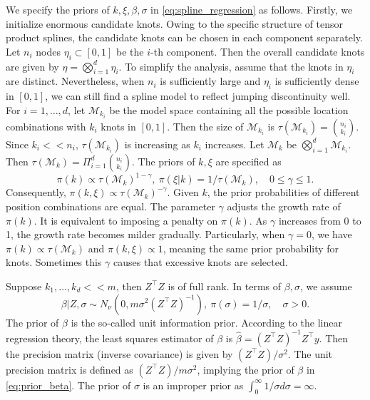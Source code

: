 We specify the priors of $k,\xi,\beta,\sigma$ in \eqref{eq:spline_regression} as follows. Firstly, we initialize enormous candidate knots. Owing to the specific structure of tensor product splines, the candidate knots can be chosen in each component separately. Let $n_i$ nodes $\eta_i\subset [0,1]$ be the $i$-th component. Then the overall candidate knots are given by $\eta=\bigotimes_{i=1}^d \eta_i$. To simplify the analysis, assume that the knots in $\eta_i$ are distinct. Nevertheless, when $n_i$ is sufficiently large and $\eta_i$ is sufficiently dense in $[0,1]$, we can still find a spline model to reflect jumping discontinuity well. %
For $i=1,\ldots,d$, let $\mathcal{M}_{k_i}$ be the model space containing all the possible location combinations with $k_i$ knots in $[0,1]$. Then the size of $\mathcal{M}_{k_i}$ is $\tau(\mathcal{M}_{k_i})=\binom{n_i}{k_i}$. Since $k_i<<n_i$, $\tau(\mathcal{M}_{k_i})$ is increasing as $k_i$ increases. Let $\mathcal{M}_k$ be $\bigotimes_{i=1}^d \mathcal{M}_{k_i}$. Then $\tau(\mathcal{M}_k)=\Pi_{i=1}^d \binom{n_i}{k_i}$. The priors of $k,\xi$ are specified as 
\begin{equation}
    \label{eq:prior}
    \pi(k)\propto \tau(\mathcal{M}_k)^{1-\gamma},~\pi(\xi|k)={1}/{\tau(\mathcal{M}_k)},\quad 0\leq \gamma \leq 1.
\end{equation}
Consequently, $\pi(k,\xi)\propto \tau(\mathcal{M}_k)^{-\gamma}$. Given $k$, the prior probabilities of different position combinations are equal. The parameter $\gamma$ adjusts the growth rate of $\pi(k)$. It is equivalent to imposing a penalty on $\pi(k)$. As $\gamma$ increases from 0 to 1, the growth rate becomes milder gradually. Particularly, when $\gamma=0$, we have $\pi(k)\propto \tau(\mathcal{M}_k)$ and $\pi(k,\xi)\propto 1$, meaning the same prior probability for knots. Sometimes this $\gamma$ causes that excessive knots are selected.

Suppose $k_1,\ldots,k_d<<m$, then $Z^\top Z$ is of full rank. In terms of $\beta,\sigma$, we assume
\begin{equation}
    \label{eq:prior_beta}
    \beta|Z,\sigma \sim N_\nu\left(0,m\sigma^2(Z^\top Z)^{-1}\right),~\pi(\sigma)={1}/{\sigma},\quad \sigma>0.
\end{equation}
The prior of $\beta$ is the so-called unit information prior. According to the linear regression theory, the least squares estimator of $\beta$ is $\hat{\beta}=(Z^\top Z)^{-1}Z^\top y$. Then the precision matrix (inverse covariance) is given by $(Z^\top Z)/\sigma^2$. The unit precision matrix is defined as $(Z^\top Z)/m\sigma^2$, implying the prior of $\beta$ in \eqref{eq:prior_beta}. %
The prior of $\sigma$ is an improper prior as $\int_0^\infty 1/\sigma d\sigma=\infty$. %

